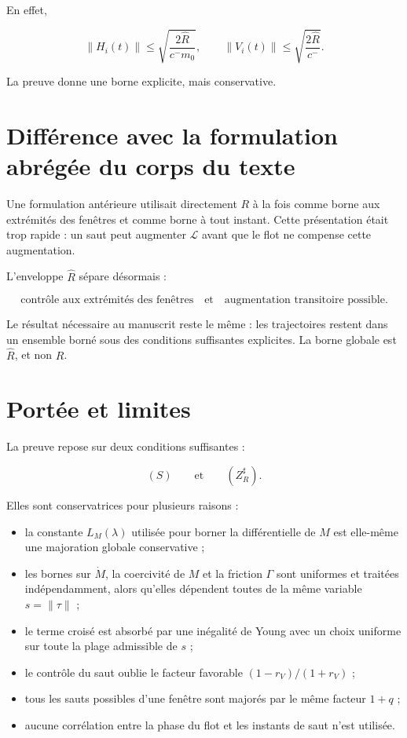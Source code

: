 En effet,

\[
\|H_i(t)\|
\leq
\sqrt{\frac{2\widehat R}{c^{-}m_0}},
\qquad
\|V_i(t)\|
\leq
\sqrt{\frac{2\widehat R}{c^{-}}}.
\]

La preuve donne une borne explicite, mais conservative.

\section{Différence avec la formulation abrégée du corps du texte}
\label{annexe-energie-correction-formulation}

Une formulation antérieure utilisait directement \(R\) à la fois comme
borne aux extrémités des fenêtres et comme borne à tout instant. Cette
présentation était trop rapide : un saut peut augmenter
\(\mathcal L\) avant que le flot ne compense cette augmentation.

L'enveloppe \(\widehat R\) sépare désormais :

\[
\text{contrôle aux extrémités des fenêtres}
\quad\text{et}\quad
\text{augmentation transitoire possible}.
\]

Le résultat nécessaire au manuscrit reste le même : les trajectoires
restent dans un ensemble borné sous des conditions suffisantes
explicites. La borne globale est \(\widehat R\), et non \(R\).

\section{Portée et limites}\label{annexe-energie-limites}

La preuve repose sur deux conditions suffisantes :

\[
(S)
\qquad\text{et}\qquad
(Z_R^\sharp).
\]

Elles sont conservatrices pour plusieurs raisons :

\begin{itemize}
\item
la constante \(L_M(\lambda)\) utilisée pour borner la différentielle de \(M\) est elle-même une majoration globale conservative ;
\item
les bornes sur \(\dot M\), la coercivité de \(M\) et la friction \(\Gamma\) sont uniformes et traitées indépendamment, alors qu'elles dépendent toutes de la même variable \(s=\|\tau\|\) ;
\item
le terme croisé est absorbé par une inégalité de Young avec un choix uniforme sur toute la plage admissible de \(s\) ;
\item
le contrôle du saut oublie le facteur favorable
\((1-r_V)/(1+r_V)\) ;
\item
tous les sauts possibles d'une fenêtre sont majorés par le même
facteur \(1+q\) ;
\item
aucune corrélation entre la phase du flot et les instants de saut
n'est utilisée.
\end{itemize}

